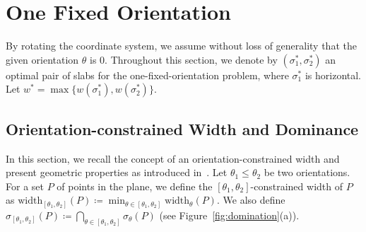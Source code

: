 \documentclass[10pt,a4paper]{article}
\theoremstyle{star}
\theoremstyle{claimstar}
\newcommand{\eps}{\ensuremath{\varepsilon}}
\newcommand{\width}{\ensuremath{\mathrm{width}}}
\begin{document}
    
    
    
    


\section{One Fixed Orientation}
\label{sec:one_fixed}




By rotating the coordinate system, we assume without loss of generality that the given orientation $\theta$ is $0$. 
Throughout this section, we denote by $(\sigma_1^*, \sigma_2^*)$ an optimal pair of slabs for the one-fixed-orientation problem, where $\sigma_1^*$ is horizontal. Let $w^* = \max \{w(\sigma_1^*), w(\sigma_2^*) \}$.



\subsection{Orientation-constrained Width and Dominance}
\label{sec:one_fixed_properties}
In this section, we recall the concept of an orientation-constrained width and present geometric properties as introduced in~\cite{ahn2024constrained}.
Let $\theta_1\le \theta_2$ be two orientations. 
For a set $P$ of points in the plane, we define the $[\theta_1, \theta_2]$-constrained width of $P$ as $\width_{[\theta_1, \theta_2]}(P) \coloneq \min_{\theta \in [\theta_1, \theta_2]} \width_\theta (P).$ 
We also define $\sigma_{[\theta_1, \theta_2]}(P) \coloneq \bigcap_{\theta \in [\theta_1, \theta_2]} \sigma_\theta (P)$ (see Figure~\ref{fig:domination}(a)).
        
\end{document}
